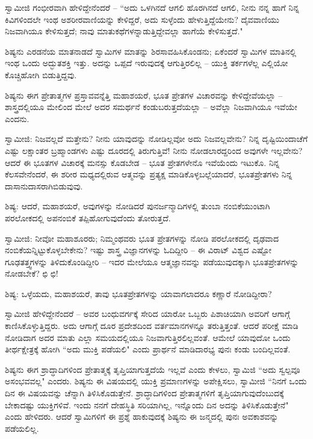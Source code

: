 ಸ್ವಾಮೀಜಿ ಗಂಭೀರವಾಗಿ ಹೇಳಿದ್ದೇನೆಂದರೆ – “ಅದು ಒಳಗಿನದೆ ಆಗಲಿ ಹೊರಗಿನದೆ ಆಗಲಿ, ನೀನು ನನ್ನ ಹಾಗೆ ನಿನ್ನ ಕಿವಿಗಳಿಂದಲೇ ಇಂಥ ಅಶರೀರವಾಣಿಯನ್ನು ಕೇಳಿದ್ದರೆ, ಅದು ಸುಳ್ಳೆಂದು ಹೇಳುತ್ತಿದ್ದೆಯೇನು? ದೈವವಾಣಿಯು ನಿಜವಾಗಿಯೂ ಕೇಳಿಸುತ್ತದೆ; ನಾವು ಮಾತುಕಥೆಗಳನ್ನಾಡುತ್ತಿದ್ದೇವಲ್ಲಾ ಹಾಗೆಯೆ ಕೇಳಿಸುತ್ತದೆ."

ಶಿಷ್ಯನು ಎರಡನೆಯ ಮಾತನಾಡದೆ ಸ್ವಾಮಿಗಳ ಮಾತನ್ನು ಶಿರಸಾವಹಿಸಿಕೊಂಡನು; ಏಕೆಂದರೆ ಸ್ವಾಮಿಗಳ ಮಾತಿನಲ್ಲಿ ಇಂಥ ಒಂದು ಅದ್ಭುತಶಕ್ತಿ ಇತ್ತು. ಅದನ್ನು ಒಪ್ಪದೆ ಇರುವುದಕ್ಕೆ ಆಗುತ್ತಿರಲಿಲ್ಲ – ಯುಕ್ತಿ ತರ್ಕಗಳೆಲ್ಲ ಎಲ್ಲಿಯೋ ಕೊಚ್ಚಿಹೋಗಿ ಬಿಡುತ್ತಿದ್ದವು.

ಶಿಷ್ಯನು ಈಗ ಪ್ರೇತಾತ್ಮಗಳ ಪ್ರಸ್ತಾವವನ್ನೆತ್ತಿ ಮಹಾಶಯರೆ, ಭೂತ ಪ್ರೇತಗಳ ವಿಚಾರವನ್ನು ಕೇಳಿದ್ದೇವೆಯಲ್ಲಾ – ಶಾಸ್ತ್ರದಲ್ಲಿಯೂ ಮೇಲಿಂದ ಮೇಲೆ ಅದರ ಸಮರ್ಥನೆ ಕಂಡುಬರುತ್ತದೆಯಲ್ಲಾ – ಅವೆಲ್ಲಾ ನಿಜವಾಗಿಯೂ ಇವೆಯೇ ಎಂದನು.

ಸ್ವಾಮೀಜಿ: ನಿಜವಲ್ಲದೆ ಮತ್ತೇನು? ನೀನು ಯಾವುದನ್ನು ನೋಡಿಲ್ಲವೋ ಅದು ನಿಜವಲ್ಲವೇನು? ನಿನ್ನ ದೃಷ್ಟಿಯಿಂದಾಚೆಗೆ ಎಷ್ಟು ಲಕ್ಷಾಂತರ ಬ್ರಹ್ಮಾಂಡಗಳು ಎಷ್ಟು ದೂರದಲ್ಲಿ ತಿರುಗುತ್ತಿವೆ! ನೀನು ನೋಡಲಾರದ್ದರಿಂದ ಅವುಗಳೇ ಇಲ್ಲವೇನು? ಆದರೆ ಈ ಭೂತಗಳ ವಿಚಾರಕ್ಕೆ ಮನಸ್ಸು ಕೊಡಬೇಡ – ಭೂತ ಪ್ರೇತಗಳೇನೊ ಇವೆಯೆಂದು ಇಟುಕೊ. ನಿನ್ನ ಕೆಲಸವೇನೆಂದರೆ, ಈ ಶರೀರ ಮಧ್ಯದಲ್ಲಿರುವ ಆತ್ಮವನ್ನು ಪ್ರತ್ಯಕ್ಷ ಮಾಡಿಕೊಳ್ಳಬಲ್ಲೆಯಾದರೆ, ಭೂತಪ್ರೇತಗಳು ನಿನ್ನ ದಾಸಾನುದಾಸರಾಗಿಬಿಡುವುವು.

ಶಿಷ್ಯ: ಆದರೆ, ಮಹಾಶಯರೆ, ಅವುಗಳನ್ನು ನೋಡಿದರೆ ಪುನರ್ಜನ್ಮಾದಿಗಳಲ್ಲಿ ತುಂಬಾ ನಂಬಿಕೆಯುಂಟಾಗಿ ಪರಲೋಕದಲ್ಲಿ ಅಪನಂಬಿಕೆ ತಪ್ಪಿಹೋಗುವುದೆಂದು ತೋರುತ್ತದೆ.

ಸ್ವಾಮೀಜಿ: ನೀವೋ ಮಹಾಶೂರರು; ನಿಮ್ಮಂಥವರು ಭೂತ ಪ್ರೇತಗಳನ್ನು ನೋಡಿ ಪರಲೋಕದಲ್ಲಿ ದೃಢವಾದ ನಂಬಿಕೆಯನ್ನಿಟ್ಟುಕೊಳ್ಳಬೇಕೇನು? ಇಷ್ಟು ಶಾಸ್ತ್ರ ವಿಜ್ಞಾನಗಳನ್ನು ಓದಿದ್ದೀರಿ – ಈ ವಿರಾಟ್ ವಿಶ್ವದ ಎಷ್ಟೋ ಗೂಢತತ್ತ್ವಗಳನ್ನು ತಿಳಿದುಕೊಂಡಿದ್ದೀರಿ – ಇದರ ಮೇಲೆಯೂ ಆತ್ಮಜ್ಞಾನವನ್ನು ಪಡೆಯುವುದಕ್ಕಾಗಿ ಭೂತಪ್ರೇತಗಳನ್ನು ನೋಡಬೇಕೆ? ಛಿ ಛಿ!

ಶಿಷ್ಯ: ಒಳ್ಳೆಯದು, ಮಹಾಶಯರೆ, ತಾವು ಭೂತಪ್ರೇತಗಳನ್ನು ಯಾವಾಗಲಾದರೂ ಕಣ್ಣಾರೆ ನೋಡಿದ್ದೀರಾ?

ಸ್ವಾಮೀಜಿ ಹೇಳಿದ್ದೇನೆಂದರೆ – ಅವರ ಬಂಧುವರ್ಗಕ್ಕೆ ಸೇರಿದ ಯಾರೋ ಒಬ್ಬರು ಪಿಶಾಚಿಯಾಗಿ ಅವರಿಗೆ ಆಗಾಗ್ಗೆ ಕಾಣಿಸಿಕೊಳ್ಳುತ್ತಿದ್ದರು. ಅದು ಆಗಾಗ್ಗೆ ದೂರ ಪ್ರದೇಶದಿಂದ ವರ್ತಮಾನಗಳನ್ನೂ ತರುತ್ತಿತ್ತಂತೆ. ಆದರೆ ಪರೀಕ್ಷೆ ಮಾಡಿ ನೋಡಿದಾಗ ಅದರ ಮಾತು ಎಲ್ಲಾ ಸಮಯದಲ್ಲಿಯೂ ನಿಜವಾಗುತ್ತಿರಲಿಲ್ಲವಂತೆ. ಆಮೇಲೆ ಯಾವುದೋ ಒಂದು ತೀರ್ಥಕ್ಷೇತ್ರಕ್ಕೆ ಹೋಗಿ “ಅದು ಮುಕ್ತಿ ಪಡೆಯಲಿ" ಎಂದು ಪ್ರಾರ್ಥನೆ ಮಾಡಿದಾರಭ್ಯ ಪುನಃ ಕಂಡು ಬಂದಿಲ್ಲವಂತೆ.

ಶಿಷ್ಯನು ಈಗ ಶ್ರಾದ್ಧಾದಿಗಳಿಂದ ಪ್ರೇತಾತ್ಮಕ್ಕೆ ತೃಪ್ತಿಯಾಗುತ್ತದೆಯೆ ಇಲ್ಲವೆ ಎಂದು ಕೇಳಲು, ಸ್ವಾಮಿಜಿ “ಅದು ಸ್ವಲ್ಪವೂ ಅಸಂಭವವಲ್ಲ" ಎಂದರು. ಶಿಷ್ಯನು ಈ ವಿಷಯದಲ್ಲಿ ಯುಕ್ತಿ ಪ್ರಮಾಣಗಳನ್ನು ಅಪೇಕ್ಷಿಸಲು, ಸ್ವಾಮೀಜಿ “ನಿನಗೆ ಒಂದು ದಿನ ಈ ವಿಷಯವನ್ನು ಚೆನ್ನಾಗಿ ತಿಳಿಸಿಕೊಡುತ್ತೇನೆ. ಶ್ರಾದ್ಧಾದಿಗಳಿಂದ ಪ್ರೇತಾತ್ಮಗಳಿಗೆ ತೃಪ್ತಿಯಾಗುವುದೆಂಬುದಕ್ಕೆ ಬೇಕಾದಷ್ಟು ಯುಕ್ತಿಗಳಿವೆ. ಇಂದು ನನಗೆ ದೇಹಸ್ಥಿತಿ ಸರಿಯಾಗಿಲ್ಲ, ಇನ್ನೊಂದು ದಿನ ಅದನ್ನು ತಿಳಿಸಿಕೊಡುತ್ತೇನೆ" ಎಂದು ಹೇಳಿದರು. ಆದರೆ ಸ್ವಾಮಿಗಳಿಗೆ ಈ ಪ್ರಶ್ನೆ ಹಾಕುವುದಕ್ಕೆ ಶಿಷ್ಯನು ಈ ಜನ್ಮದಲ್ಲಿ ಪುನಃ ಅವಕಾಶವನ್ನು ಪಡೆಯಲಿಲ್ಲ.

